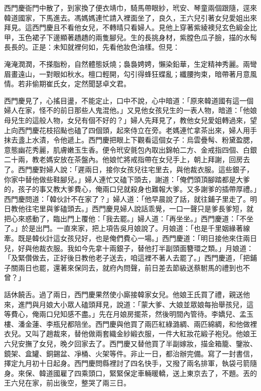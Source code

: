 西門慶衙門中散了，到家換了便衣靖巾，騎馬帶眼紗，玳安、琴童兩個跟隨，逕來韓道國家，下馬進去。馮媽媽連忙請入裡面坐了，良久，王六兒引著女兒愛姐出來拜見。這西門慶且不看他女兒，不轉晴只看婦人。見他上穿著紫綾襖兒玄色緞金比甲，玉色裙子下邊顯著趫趫的兩隻腳兒。生的長挑身材，紫膛色瓜子臉，描的水髩長長的。正是：未知就裡何如，先看他妝色油樣。但見：

淹淹潤潤，不搽脂粉，自然體態妖燒；裊裊娉娉，懶染鉛華，生定精神秀麗。兩彎眉畫遠山，一對眼如秋水。檀口輕開，勾引得蜂狂蝶亂；纖腰拘束，暗帶著月意風情。若非偷期崔氏女，定然聞瑟卓文君。

西門慶見了，心搖目盪，不能定止，口中不說，心中暗道：「原來韓道國有這一個婦人在家，怪不的前日那些人鬼混他。」又見他女孩兒生的一表人物，暗道：「他娘母兒生的這般人物，女兒有個不好的？」婦人先拜見了，教他女兒愛姐轉過來，望上向西門慶花枝招颭也磕了四個頭，起來侍立在旁。老媽連忙拿茶出來，婦人用手抹去盞上水漬，令他遞上。西門慶把眼上下觀看這個女子：烏雲疊髩、粉黛盈腮，意態幽花秀麗，肌膚嫩玉生香。便令玳安氈包內取出錦帕二方、金戒指四個、白銀二十兩，教老媽安放在茶盤內。他娘忙將戒指帶在女兒手上，朝上拜謝，回房去了。西門慶對婦人說：「遲兩日，接你女孩兒往宅里去，與他裁衣服。這些銀子，你家中替他做些鞋腳兒。」婦人連忙又磕下頭去，謝道：「俺們頭頂腳踏都是大爹的，孩子的事又教大爹費心，俺兩口兒就殺身也難報大爹。又多謝爹的插帶厚禮。」西門慶問道：「韓伙計不在家了？」婦人道：「他早晨說了話，就往鋪子里走了。明日教他往宅里與爹磕頭去。」西門慶見婦人說話乖覺，一口一聲只是爹長爹短，就把心來惑動了，臨出門上覆他：「我去罷。」婦人道：「再坐坐。」西門慶道：「不坐了。」於是出門。一直來家，把上項告吳月娘說了。月娘道：「也是千里姻緣著線牽。既是韓伙計這女孩兒好，也是俺們費心一場。」西門慶道：「明日接他來住兩日兒，好與他裁衣服。我如今先拿十兩銀子，替他打半副頭面簪環之類。」月娘道：「及緊儹做去，正好後日教他老子送去，咱這裡不著人去罷了。」西門慶道，「把鋪子關兩日也罷，還著來保同去，就府內問聲，前日差去節級送蔡駙馬的禮到也不曾？」

話休饒舌。過了兩日，西門慶果然使小廝接韓家女兒。他娘王氏買了禮，親送他來，進門與月娘大小眾人磕頭拜見，說道：「蒙大爹、大娘並眾娘每抬舉孩兒，這等費心，俺兩口兒知感不盡。」先在月娘房擺茶，然後明間內管待。李嬌兒、孟玉樓、潘金蓮、李瓶兒都陪坐。西門慶與他買了兩匹紅綠潞綢、兩匹綿綢，和他做裡衣兒。又叫了趙裁來，替他做兩套織金紗緞衣服，一件大紅妝花緞子袍兒。他娘王六兒安撫了女兒，晚夕回家去了。西門慶又替他買了半副嫁妝，描金箱籠、鑒妝、鏡架、盒罐、銅錫盆、凈桶、火架等件。非止一日，都治辦完備。寫了一封書信，擇定九月初十日起身。西門慶問縣裡討了四名快手，又撥了兩名排軍，執袋弓箭隨身。來保、韓道國雇了四乘頭口，緊緊保定車輛暖轎，送上東京去了，不題。丟的王六兒在家，前出後空，整哭了兩三日。

